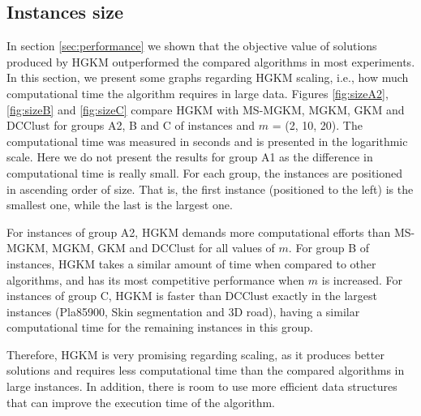 \subsection{Instances size}
In section \ref{sec:performance} we shown that the objective value of solutions produced by HGKM outperformed the compared algorithms in most experiments. In this section, we present some graphs regarding HGKM scaling, i.e., how much computational time the algorithm requires in large data. Figures \ref{fig:sizeA2}, \ref{fig:sizeB} and \ref{fig:sizeC} compare HGKM with MS-MGKM, MGKM, GKM and DCClust for groups A2, B and C of instances and $m$ = (2, 10, 20). The computational time was measured in seconds and is presented in the logarithmic scale. Here we do not present the results for group A1 as the difference in computational time is really small. For each group, the instances are positioned in ascending order of size. That is, the first instance (positioned to the left) is the smallest one, while the last is the largest one.

For instances of group A2, HGKM demands more computational efforts than MS-MGKM, MGKM, GKM and DCClust for all values of $m$. For group B of instances, HGKM takes a similar amount of time when compared to other algorithms, and has its most competitive performance when $m$ is increased. For instances of group C, HGKM is faster than DCClust exactly in the largest instances (Pla85900, Skin segmentation and 3D road), having a similar computational time for the remaining instances in this group.

Therefore, HGKM is very promising regarding scaling, as it produces better solutions and requires less computational time than the compared algorithms in large instances. In addition, there is room to use more efficient data structures that can improve the execution time of the algorithm.

